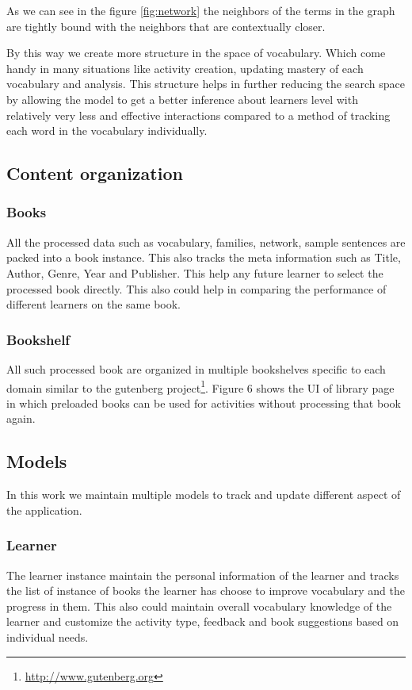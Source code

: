 \documentclass[11pt,a4paper]{article}
\begin{document}
As we can see in the figure \ref{fig:network} the neighbors of the terms in the
graph are tightly bound with the neighbors that are contextually closer.

By this way we create more structure in the space of vocabulary. Which come
handy in many situations like activity creation, updating mastery of each
vocabulary and analysis. This structure helps in further reducing the search space
by allowing the model to get a better inference about learners level with
relatively very less and effective interactions compared to a method of
tracking each word in the vocabulary individually.


\subsection{Content organization}

\subsubsection{Books}
All the processed data such as vocabulary, families, network, sample sentences
are packed into a book instance. This also tracks the meta information such as
Title, Author, Genre, Year and Publisher. This help any future learner to select
the processed book directly. This also could help in comparing the performance
of different learners on the same book.

\subsubsection{Bookshelf}
All such processed book are organized in multiple bookshelves specific to each
domain similar to the gutenberg project\footnote{\url{http://www.gutenberg.org}}.
Figure 6 shows the UI of library page in which preloaded books can be used for 
activities without processing that book again.

\subsection{Models}
In this work we maintain multiple models to track and update different aspect
of the application.

\subsubsection{Learner}
The learner instance maintain the personal information of the learner and tracks
the list of instance of books the learner has choose to improve vocabulary and the
progress in them. This also could maintain overall vocabulary knowledge of
the learner and customize the activity type, feedback and book suggestions based
on individual needs.
\end{document}
